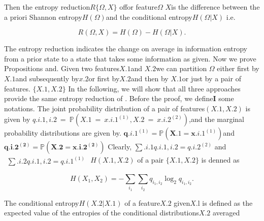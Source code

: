 \documentclass{article}
\begin{document}
Then the entropy reduction$R \{ \Omega, X \}$ offor feature$\Omega$ $X$is the difference between
the a priori Shannon entropy$H ( \Omega )$and the conditional entropy$H ( { \mathfrak { \Omega } } | X )$ i.e.


\begin{equation}
R ( \Omega, X ) = H ( \Omega ) - H ( \Omega | X ).
\end{equation}


The entropy reduction indicates the change on average in information entropy
from a prior state to a state that takes some information as given. Now we
prove Propositions and.  Given two features$X . { 1 }$and $X . { 2 }$we can partition $\Omega$
either first by$X . { 1 }$and subsequently by$x . { 2 }$or first by$X . { 2 }$and then by $X . { 1 }$or
just by a pair of features. $\{ X . { 1 }, X . { 2 } \}$ In the following, we will show that all three
approaches provide the same entropy reduction of . Before the proof, we define$\mathbf { I }$
some notations. The joint probability distribution of a pair of features$( X . { 1 }, X . { 2 } )$
is given by $q . { i . { 1 }, i . { 2 } } ~ = ~ \mathbb { P } ( X . { 1 } ~ = ~ x . { i . { 1 } } ^ { ( 1 ) }, X . { 2 } ~ = ~ x . { i . { 2 } } ^ { ( 2 ) } )$,and the marginal probability
distributions are given by. $\pmb { q } . { i . { 1 } } ^ { ( 1 ) } = \mathbb { P } ( \pmb { X } . { 1 } = \pmb { x } . { i . { 1 } } ^ { ( 1 ) } )$and$\pmb { q . { i . { 2 } } ^ { ( 2 ) } } = \mathbb { P } ( \pmb { X . { 2 } } = \pmb { x . { i . { 2 } } ^ { ( 2 ) } } )$ Clearly,
$\sum . { i . { 1 } } q . { i . { 1 }, i . { 2 } } = q . { i . { 2 } } ^ { ( 2 ) }$ and$\begin{array} { r } { \sum . { i . { 2 } } q . { i . { 1 }, i . { 2 } } = q . { i . { 1 } } ^ { ( 1 ) } } \end{array}$ $H ( X . { 1 }, X . { 2 } )$ of a pair
$\{ X . { 1 }, X . { 2 } \}$ is denned as


\begin{equation}
H ( X _ { 1 }, X _ { 2 } ) = - \sum _ { i _ { 1 } } \sum _ { i _ { 2 } } q _ { i _ { 1 }, i _ { 2 } } \log _ { 2 } q _ { i _ { 1 }, i _ { 2 } }.
\end{equation}


The conditional entropy$H ( X . { 2 } | X . { 1 } )$ of a feature$X . { 2 }$ given$X . { \mathrm { l } }$ is defined as the
expected value of the entropies of the conditional distributions$X . { 2 }$ averaged
\end{document}
